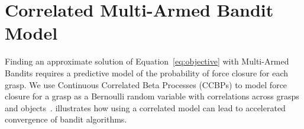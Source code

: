 \section{Correlated Multi-Armed Bandit Model}

Finding an approximate solution of Equation~\ref{eq:objective} with Multi-Armed Bandits requires a predictive model of the probability of force closure for each grasp.
We use Continuous Correlated Beta Processes (CCBPs) to model force closure for a grasp as a Bernoulli random variable with correlations across grasps and objects~\cite{goetschalckx2011continuous, montesano2012active}.
 illustrates how using a correlated model can lead to accelerated convergence of bandit algorithms.

